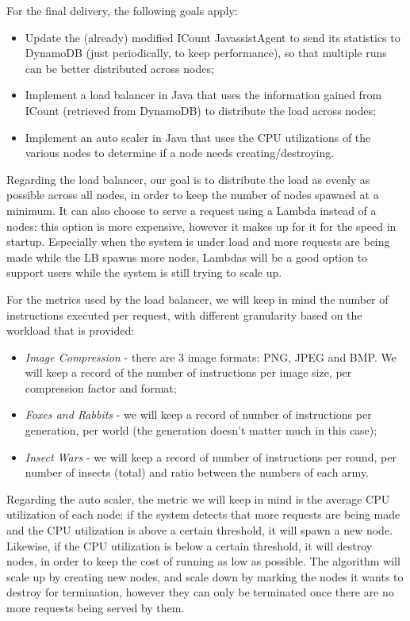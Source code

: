 \documentclass{article}
\begin{document}
For the final delivery, the following goals apply:
\begin{itemize}
    \item Update the (already) modified ICount JavassistAgent to send its
        statistics to DynamoDB (just periodically, to keep performance), so that
        multiple runs can be better distributed across nodes;
    \item Implement a load balancer in Java that uses the information gained
        from ICount (retrieved from DynamoDB) to distribute the load across
        nodes;
    \item Implement an auto scaler in Java that uses the CPU utilizations of the
        various nodes to determine if a node needs creating/destroying.
\end{itemize}

Regarding the load balancer, our goal is to distribute the load as evenly as
possible across all nodes, in order to keep the number of nodes spawned at a
minimum. It can also choose to serve a request using a Lambda instead of a
nodes: this option is more expensive, however it makes up for it for the speed
in startup. Especially when the system is under load and more requests are being
made while the LB spawns more nodes, Lambdas will be a good option to support
users while the system is still trying to scale up.

For the metrics used by the load balancer, we will keep in mind the number of
instructions executed per request, with different granularity based on the
workload that is provided:

\begin{itemize}
    \item \textit{Image Compression} - there are 3 image formats: PNG, JPEG and
        BMP. We will keep a record of the number of instructions per image size,
        per compression factor and format;
    \item \textit{Foxes and Rabbits} - we will keep a record of number of
        instructions per generation, per world (the generation doesn't matter
        much in this case);
    \item \textit{Insect Wars} - we will keep a record of number of instructions
        per round, per number of insects (total) and ratio between the numbers
        of each army.
\end{itemize}

Regarding the auto scaler, the metric we will keep in mind is the average CPU
utilization of each node: if the system detects that more requests are being
made and the CPU utilization is above a certain threshold, it will spawn a new
node. Likewise, if the CPU utilization is below a certain threshold, it will
destroy nodes, in order to keep the cost of running as low as possible. The
algorithm will scale up by creating new nodes, and scale down by marking the
nodes it wants to destroy for termination, however they can only be terminated
once there are no more requests being served by them.
\end{document}
